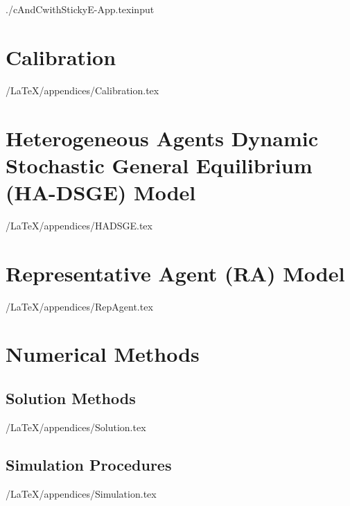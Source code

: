 \documentclass[titlepage]{\econtex}
\begin{document}
	\titlepagefinish
	\setcounter{page}{1}
	\setcounter{table}{4} %
	\setcounter{equation}{20} %
	
	\pagebreak

\appendix



\begin{verbatimwrite}{./cAndCwithStickyE-App.texinput}
  \hypertarget{Appendix}{}
\hypertarget{Calibration-Appendix}{}
\section{Calibration}\label{app:Calibration}

\econtexRoot/LaTeX/appendices/Calibration.tex

\section{Heterogeneous Agents Dynamic Stochastic General Equilibrium (HA-DSGE) Model}
\label{sec:HADSGE}

\econtexRoot/LaTeX/appendices/HADSGE.tex



\section{Representative Agent (RA) Model}\label{sec:RepAgent}

\econtexRoot/LaTeX/appendices/RepAgent.tex


\section{Numerical Methods}\label{appendix:Numeric}

\subsection{Solution Methods}\label{appendix:Solution}

\econtexRoot/LaTeX/appendices/Solution.tex


\subsection{Simulation Procedures}\label{appendix:Simulation}

\econtexRoot/LaTeX/appendices/Simulation.tex



\end{verbatimwrite}
\end{document}
